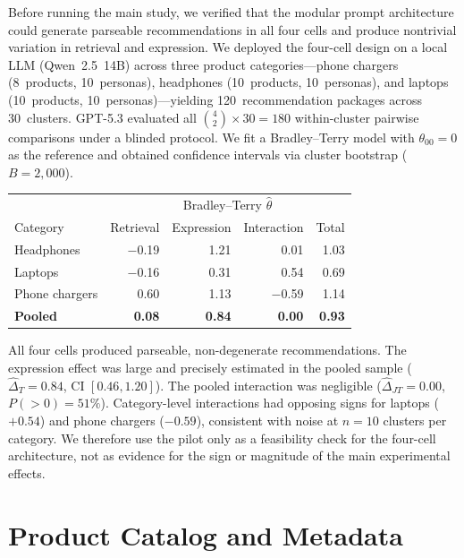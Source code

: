 \documentclass[11pt]{article}
\begin{document}
Before running the main study, we verified that the modular prompt architecture could generate parseable recommendations in all four cells and produce nontrivial variation in retrieval and expression. We deployed the four-cell design on a local LLM (Qwen~2.5~14B) across three product categories---phone chargers (8~products, 10~personas), headphones (10~products, 10~personas), and laptops (10~products, 10~personas)---yielding 120~recommendation packages across 30~clusters. GPT-5.3 evaluated all $\binom{4}{2} \times 30 = 180$ within-cluster pairwise comparisons under a blinded protocol. We fit a Bradley--Terry model \citep{bradley1952rank} with $\theta_{00} = 0$ as the reference and obtained confidence intervals via cluster bootstrap ($B = 2{,}000$).

\begin{center}
\small
\begin{tabular}{lrrrr}
\toprule
& \multicolumn{4}{c}{Bradley--Terry $\hat{\theta}$} \\
Category & Retrieval & Expression & Interaction & Total \\
\midrule
Headphones    & $-$0.19 & 1.21 & 0.01 & 1.03 \\
Laptops       & $-$0.16 & 0.31 & 0.54 & 0.69 \\
Phone chargers & 0.60  & 1.13 & $-$0.59 & 1.14 \\
\midrule
\textbf{Pooled} & \textbf{0.08} & \textbf{0.84} & \textbf{0.00} & \textbf{0.93} \\
\bottomrule
\end{tabular}
\end{center}

All four cells produced parseable, non-degenerate recommendations. The expression effect was large and precisely estimated in the pooled sample ($\hat{\Delta}_T = 0.84$, CI $[0.46, 1.20]$). The pooled interaction was negligible ($\hat{\Delta}_{JT} = 0.00$, $P(>0) = 51\%$). Category-level interactions had opposing signs for laptops ($+0.54$) and phone chargers ($-0.59$), consistent with noise at $n = 10$ clusters per category. We therefore use the pilot only as a feasibility check for the four-cell architecture, not as evidence for the sign or magnitude of the main experimental effects.

\section{Product Catalog and Metadata}\label{section:catalog}
\end{document}
